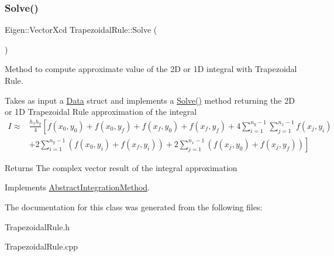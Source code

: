 \subsubsection{\texorpdfstring{Solve()}{Solve()}}
{\footnotesize\ttfamily Eigen\+::\+Vector\+Xcd Trapezoidal\+Rule\+::\+Solve (\begin{DoxyParamCaption}{ }\end{DoxyParamCaption})\hspace{0.3cm}{\ttfamily [virtual]}}



Method to compute approximate value of the 2D or 1D integral with Trapezoidal Rule. 

Takes as input a \hyperlink{struct_data}{Data} struct and implements a \hyperlink{class_trapezoidal_rule_ae822d86948bdc8876bf524cd620e11b8}{Solve()} method returning the 2D or 1D Trapezoidal Rule approximation of the integral \begin{eqnarray*} I \approx& \frac{h_x h_y}{4} \left[ f(x_0, y_0)+f(x_0,y_f)+f(x_f,y_0)+f(x_f,y_f) + 4 \sum_{i=1}^{n_y-1} \sum_{j=1}^{n_x-1} f(x_j, y_i) \right.\\ & \left. + 2 \sum_{i=1}^{n_y-1} \left(f(x_0, y_i)+f(x_f,y_i)\right) + 2 \sum_{j=1}^{n_x-1} \left(f(x_j, y_0)+f(x_j,y_f)\right) \right] \end{eqnarray*}

\begin{DoxyReturn}{Returns}
The complex vector result of the integral approximation 
\end{DoxyReturn}


Implements \hyperlink{class_abstract_integration_method_af76e5bdce7d0b139d07e920fa29c1c34}{Abstract\+Integration\+Method}.



The documentation for this class was generated from the following files\+:\begin{DoxyCompactItemize}
\item 
Trapezoidal\+Rule.\+h\item 
Trapezoidal\+Rule.\+cpp\end{DoxyCompactItemize}
